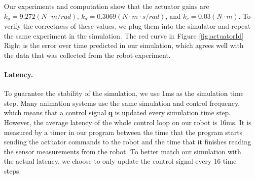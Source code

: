 Our experiments and computation show that the actuator gains are $k_p=9.272(N\cdot m/rad)$, $k_d=0.3069(N\cdot m\cdot s/rad)$, and $k_c=0.03(N\cdot m)$. To verify the correctness of these values, we plug them into the simulator and repeat the same experiment in the simulation. The red curve in Figure \ref{fig:actuatorId} Right is the error over time predicted in our simulation, which agrees well with the data that was collected from the robot experiment.

\paragraph{Latency.} To guarantee the stability of the simulation, we use 1ms as the simulation time step. Many animation systems use the same simulation and control frequency, which means that a control signal $\bar{\mathbf{q}}$ is updated every simulation time step. However, the average latency of the whole control loop on our robot is 16ms. It is measured by a timer in our program between the time that the program starts sending the actuator commands to the robot and the time that it finishes reading the sensor measurements from the robot. To better match our simulation with the actual latency, we choose to only update the control signal every 16 time steps.
